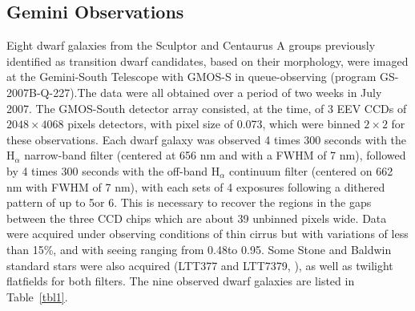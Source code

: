 \documentclass[12pt,preprint]{emulateapj}
\begin{document}



\subsection{Gemini Observations}

Eight dwarf galaxies from the Sculptor and Centaurus A groups previously identified as transition dwarf candidates, based on their morphology,  were 
imaged at the Gemini-South Telescope with GMOS-S in queue-observing (program GS-2007B-Q-227).The data were all obtained over a period of two 
weeks in July 2007. The GMOS-South detector array consisted, at the time, of 3 EEV CCDs of $2048\times 4068$ pixels detectors, with pixel size of 
0.073\arcsec, which were binned $2\times 2$ for these observations. Each dwarf galaxy was observed 4 times 300 seconds with the H$_\alpha$ 
narrow-band filter (centered at 656 nm and with a FWHM of 7 nm), followed by 4 times 300 seconds with the off-band H$_\alpha$ continuum filter (centered on 662 nm with FWHM of 7 nm), with each sets of 4 exposures 
following a dithered pattern of up to 5\arcsec or 6\arcsec. This is necessary to recover the regions in the gaps between the three CCD chips which are 
about 39 unbinned pixels wide. Data were acquired under observing conditions of thin cirrus but with variations of less than 15\%, and with seeing
ranging from 0.48\arcsec to 0.95\arcsec. Some Stone and Baldwin standard stars were also acquired (LTT377 and LTT7379, \cite{sb83}), as well as 
twilight flatfields for both filters. The nine observed dwarf galaxies are listed in Table~\ref{tbl1}.
\end{document}
